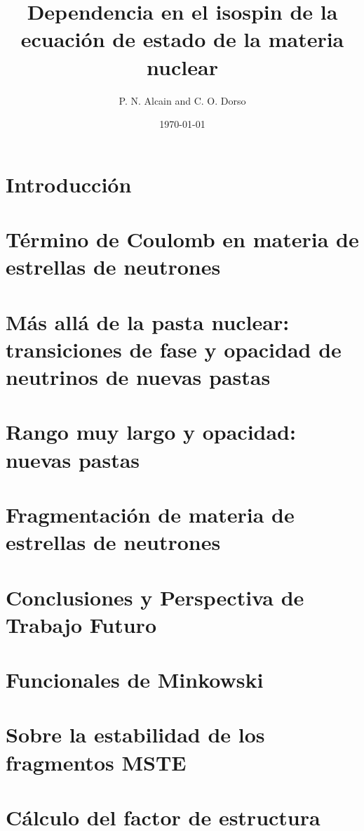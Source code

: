 \documentclass[12pt]{book}
\begin{document}
\title{Dependencia en el isospin de la ecuación de estado de la materia nuclear}

\author{P. N. Alcain and C. O. Dorso}

\date{\today}
\maketitle
\tableofcontents

\chapter[Introducción]{Introducción}
\label{ch:introduccion}



\chapter[Efecto de Coulomb]{Término de Coulomb en materia de estrellas de neutrones}
\label{ch:coulomb}


\chapter[Transiciones de fase]{Más allá de la pasta nuclear: transiciones de fase y opacidad de neutrinos de nuevas pastas}
\label{ch:transicion}


\chapter[Nuevas pastas]{Rango muy largo y opacidad: nuevas pastas}
\label{ch:nuevas_pastas}


\chapter[Fragmentación]{Fragmentación de materia de estrellas de neutrones}
\label{ch:fragmentacion}


\chapter[Conclusiones]{Conclusiones y Perspectiva de Trabajo Futuro}
\label{ch:conclusiones}


\appendix
\chapter{Funcionales de Minkowski}
\label{ap:minkowski}


\chapter{Sobre la estabilidad de los fragmentos MSTE}
\label{ap:mste}


\chapter{Cálculo del factor de estructura}
\label{ap:sq}



\end{document}
